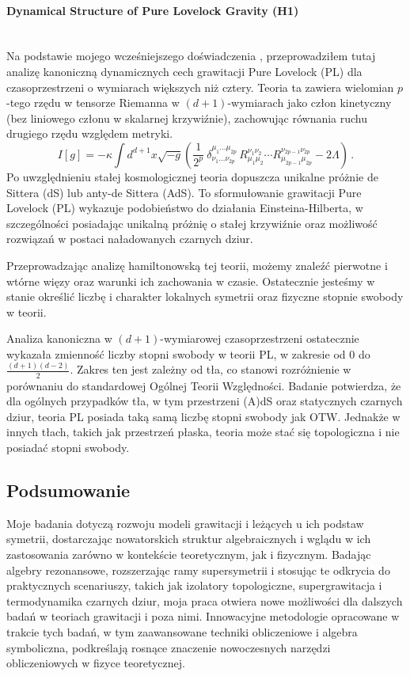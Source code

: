 \documentclass[12pt,a4paper]{article}
\newcommand{\myparagraph}[1]{\paragraph{#1}\mbox{}\\}
\begin{document}
\myparagraph{Dynamical Structure of Pure Lovelock Gravity (H1)}

Na podstawie mojego wcześniejszego doświadczenia \cite{Durka:2012wd, Durka:2010zx}, przeprowadziłem tutaj analizę kanoniczną dynamicznych cech grawitacji Pure Lovelock (PL) dla czasoprzestrzeni o wymiarach większych niż cztery. Teoria ta zawiera wielomian $p$-tego rzędu w tensorze Riemanna w $(d+1)$-wymiarach jako człon kinetyczny (bez liniowego członu w skalarnej krzywiźnie), zachowując równania ruchu drugiego rzędu względem metryki.
\begin{equation}
	I[g]=-\kappa\int d^{d+1}x\sqrt{-g}\left(  \frac{1}{2^{p}}\ \delta_{\nu
		_{1}...\nu_{2p}}^{\mu_{1}...\mu_{2p}}\,R_{\mu_{1}\mu_{2}}^{\nu_{1}\nu_{2}%
	}\cdots R_{\mu_{2p-1}\mu_{2p}}^{\nu_{2p-1}\nu_{2p}}-2\Lambda\right)  \,.
	\label{PL}%
\end{equation}
Po uwzględnieniu stałej kosmologicznej teoria dopuszcza unikalne próżnie de Sittera (dS) lub anty-de Sittera (AdS). To sformułowanie grawitacji Pure Lovelock (PL) wykazuje podobieństwo do działania Einsteina-Hilberta, w szczególności posiadając unikalną próżnię o stałej krzywiźnie oraz możliwość rozwiązań w postaci naładowanych czarnych dziur.

Przeprowadzając analizę hamiltonowską tej teorii, możemy znaleźć pierwotne i wtórne więzy oraz warunki ich zachowania w czasie. Ostatecznie jesteśmy w stanie określić liczbę i charakter lokalnych symetrii oraz fizyczne stopnie swobody w teorii.

Analiza kanoniczna w $(d+1)$-wymiarowej czasoprzestrzeni ostatecznie wykazała zmienność liczby stopni swobody w teorii PL, w zakresie od $0$ do $\frac{(d+1)(d-2)}{2}$. Zakres ten jest zależny od tła, co stanowi rozróżnienie w porównaniu do standardowej Ogólnej Teorii Względności. Badanie potwierdza, że dla ogólnych przypadków tła, w tym przestrzeni (A)dS oraz statycznych czarnych dziur, teoria PL posiada taką samą liczbę stopni swobody jak OTW. Jednakże w innych tłach, takich jak przestrzeń płaska, teoria może stać się topologiczna i nie posiadać stopni swobody.

\subsection{Podsumowanie}

Moje badania dotyczą rozwoju modeli grawitacji i leżących u ich podstaw symetrii, dostarczając nowatorskich struktur algebraicznych i wglądu w ich zastosowania zarówno w kontekście teoretycznym, jak i fizycznym. Badając algebry rezonansowe, rozszerzając ramy supersymetrii i stosując te odkrycia do praktycznych scenariuszy, takich jak izolatory topologiczne, supergrawitacja i termodynamika czarnych dziur, moja praca otwiera nowe możliwości dla dalszych badań w teoriach grawitacji i poza nimi. Innowacyjne metodologie opracowane w trakcie tych badań, w tym zaawansowane techniki obliczeniowe i algebra symboliczna, podkreślają rosnące znaczenie nowoczesnych narzędzi obliczeniowych w fizyce teoretycznej. 
\end{document}
